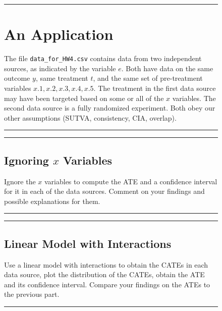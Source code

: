 \documentclass{article}
\newenvironment{colorparagraph}[1]{\par\color{#1}}{\par}
\begin{document}
\begin{figure}[H]
  \begin{colorparagraph}{questioncolor}
  \rule{\textwidth}{0.5pt}
  \label{q3}
  \section{An Application}

  The file \texttt{data\_for\_HW4.csv} contains data from two independent sources, as indicated by the variable \( e \). Both have data on the same outcome \( y \), same treatment \( t \), and the same set of pre-treatment variables \( x.1, x.2, x.3, x.4, x.5 \). The treatment in the first data source may have been targeted based on some or all of the \( x \) variables. The second data source is a fully randomized experiment. Both obey our other assumptions (SUTVA, consistency, CIA, overlap).

  \rule{\textwidth}{0.5pt}
  \end{colorparagraph}
\end{figure}

\begin{figure}[H]
  \begin{colorparagraph}{questioncolor}
  \rule{\textwidth}{0.5pt}
  \label{q3a}
  \subsection{Ignoring \( x \) Variables}

  Ignore the \( x \) variables to compute the ATE and a confidence interval for it in each of the data sources. Comment on your findings and possible explanations for them.

  \rule{\textwidth}{0.5pt}
  \end{colorparagraph}
\end{figure}

\begin{figure}[H]
  \begin{colorparagraph}{questioncolor}
  \rule{\textwidth}{0.5pt}
  \label{q3b}
  \subsection{Linear Model with Interactions}

  Use a linear model with interactions to obtain the CATEs in each data source, plot the distribution of the CATEs, obtain the ATE and its confidence interval. Compare your findings on the ATEs to the previous part.

  \rule{\textwidth}{0.5pt}
  \end{colorparagraph}
\end{figure}
\end{document}
